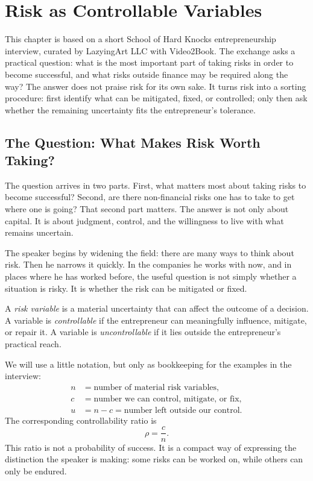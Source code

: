 \chapter{Risk as Controllable Variables}

This chapter is based on a short School of Hard Knocks entrepreneurship interview, curated by LazyingArt LLC with Video2Book. The exchange asks a practical question: what is the most important part of taking risks in order to become successful, and what risks outside finance may be required along the way? The answer does not praise risk for its own sake. It turns risk into a sorting procedure: first identify what can be mitigated, fixed, or controlled; only then ask whether the remaining uncertainty fits the entrepreneur's tolerance.

\section{The Question: What Makes Risk Worth Taking?}

The question arrives in two parts. First, what matters most about taking risks to become successful? Second, are there non-financial risks one has to take to get where one is going? That second part matters. The answer is not only about capital. It is about judgment, control, and the willingness to live with what remains uncertain.

The speaker begins by widening the field: there are many ways to think about risk. Then he narrows it quickly. In the companies he works with now, and in places where he has worked before, the useful question is not simply whether a situation is risky. It is whether the risk can be mitigated or fixed.

\begin{definition}
A \emph{risk variable} is a material uncertainty that can affect the outcome of a decision. A variable is \emph{controllable} if the entrepreneur can meaningfully influence, mitigate, or repair it. A variable is \emph{uncontrollable} if it lies outside the entrepreneur's practical reach.
\end{definition}

We will use a little notation, but only as bookkeeping for the examples in the interview:
\begin{align}
n&=\text{number of material risk variables},\\
c&=\text{number we can control, mitigate, or fix},\\
u&=n-c=\text{number left outside our control}.
\end{align}
The corresponding controllability ratio is
\begin{equation}
\rho=\frac{c}{n}.
\end{equation}
This ratio is not a probability of success. It is a compact way of expressing the distinction the speaker is making: some risks can be worked on, while others can only be endured.

